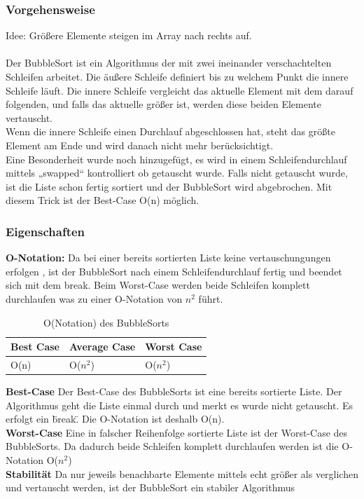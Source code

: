 \documentclass{article}
\begin{document}
\subsubsection{Vorgehensweise}
Idee: Größere Elemente steigen im Array nach rechts auf.\\ \\
Der BubbleSort ist ein Algorithmus der mit zwei ineinander verschachtelten Schleifen arbeitet. Die äußere Schleife definiert bis zu welchem Punkt die innere Schleife läuft. Die innere Schleife vergleicht das aktuelle Element mit dem darauf folgenden, und falls das aktuelle größer ist, werden diese beiden Elemente vertauscht.\\
Wenn die innere Schleife einen Durchlauf abgeschlossen hat, steht das größte Element am Ende und wird danach nicht mehr berücksichtigt. \\
Eine Besonderheit wurde noch hinzugefügt, es wird in einem Schleifendurchlauf mittels „swapped“ kontrolliert ob getauscht wurde. Falls nicht getauscht wurde, ist die Liste schon fertig sortiert und der BubbleSort wird abgebrochen. Mit diesem Trick ist der Best-Case O(n) möglich. 


\subsubsection{Eigenschaften}
\textbf{O-Notation:} Da bei einer bereits sortierten Liste keine vertauschungungen erfolgen , ist der BubbleSort nach einem Schleifendurchlauf fertig und beendet sich mit dem break. Beim Worst-Case werden beide Schleifen komplett durchlaufen was zu einer O-Notation von $n^{2}$ führt.
\begin{table}[h]
\centering
\begin{tabular}{lll}
	\hline
	\textbf{Best Case} & \textbf{Average Case} & \textbf{Worst Case} \\
	\hline
	O(n) & O($n^{2}$) & O($n^{2}$) \\
	\hline
\end{tabular}
\caption{O(Notation) des BubbleSorts \cite{ONotationen}}
\label{tab:bubbleSort}
\end{table}

\textbf{Best-Case} Der Best-Case des BubbleSorts ist eine bereits sortierte Liste. Der Algorithmus geht die Liste einmal durch und merkt es wurde nicht getauscht. Es erfolgt ein \"break\". Die O-Notation ist deshalb O(n). \\
\textbf{Worst-Case} Eine in falscher Reihenfolge sortierte Liste ist der Worst-Case des BubbleSorts. Da dadurch beide Schleifen komplett durchlaufen werden ist die O-Notation O($n^{2}$) \\
\textbf{Stabilität} Da nur jeweils benachbarte Elemente mittels echt größer als verglichen und vertauscht werden, ist der BubbleSort ein stabiler Algorithmus \\
\end{document}
